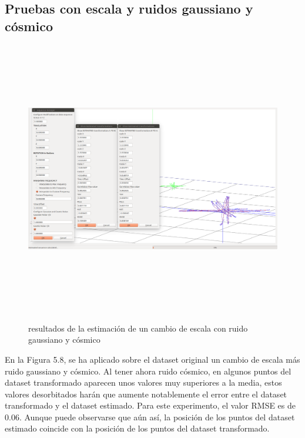 \subsection{Pruebas con escala y ruidos gaussiano y cósmico}
\begin{figure}[h]
\begin{center}
\label{fig:opciones de View}\includegraphics[height=12.0cm,width=18.0cm]{img/cap6/Escala_GaussCosmicNoise_abba.png}
\hspace{0.5cm}

\end{center}

\caption{resultados de la estimación de un cambio de escala con ruido gaussiano y cósmico}
\end{figure}

En la Figura 5.8, se ha aplicado sobre el dataset original un cambio de escala más ruido gaussiano y cósmico. Al tener ahora ruido cósmico, en algunos puntos del dataset transformado aparecen unos valores muy superiores a la media, estos valores desorbitados harán que aumente notablemente el error entre el dataset transformado y el dataset estimado. Para este experimento, el valor RMSE es de 0.06. Aunque puede observarse que aún así, la posición de los puntos del dataset estimado coincide con la posición de los puntos del dataset transformado.


